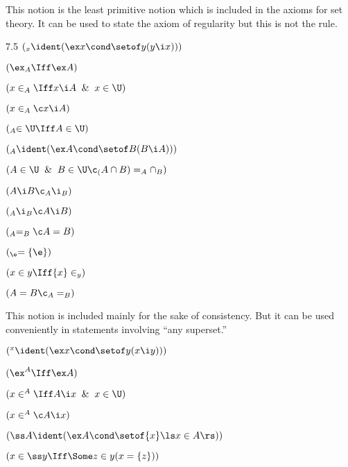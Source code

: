 This notion is the least primitive notion which is included in the axioms for set theory.
It can be used to state the axiom of regularity but this is not the rule.
\lineb


\noindent{} 7.5 $(\sb x \ident (\ex x \cond \setof y (y \i x)))$


 $(\ex \sb A \Iff \ex A)$

 $(x \in \sb A \Iff x \i A \And x \in \U)$

 $(x \in \sb A \c x \i A )$

 $(\sb A \in \U \Iff A \in \U)$

 $(\sb A \ident (\ex A \cond \setof B(B\i A)))$

 $(A\in \U \And B\in \U\c\sb(A \cap B) =  \sb A \cap \sb B)$

 $(A \i B \c \sb A \i \sb B)$

 $(\sb A \i \sb B \c A \i B)$

 $(\sb A = \sb B \c A = B)$

 $(\sb \e = \{\e\})$

 $(x \in y \Iff \{x\} \in \sb y)$

 $(A = B \c \sb A = \sb B)$
\lineb


This notion is included mainly for the sake of consistency.  But it can be 
used conveniently in statements involving ``any superset.''
\lineb


 $(\sp x \ident (\ex x \cond \setof y (x \i y)))$


 $(\ex \sp A \Iff \ex A)$

 $(x \in \sp A \Iff A \i x \And x \in \U)$

 $(x \in \sp A \c A  \i x)$
\lineb



 $(\ss A \ident(\ex A \cond\setof \{x\}\ls x\in A\rs))$
 

 $(x \in \ss y \Iff \Some z \in y (x = \{z\}))$


